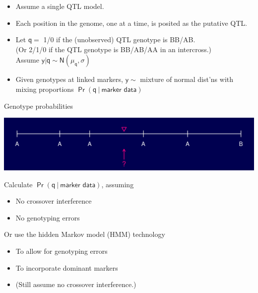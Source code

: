 \documentclass[12pt]{article}
\newcommand{\headsize}{\fontsize{35}{35} \selectfont}
\newcommand{\smallersize}{\fontsize{20}{25} \selectfont}
\begin{document}
\smallersize
\hfill \begin{minipage}{9.5in}
\begin{itemize}
\itemsep24pt
\setlength{\rightskip}{0pt plus 1fil} %
  \item Assume a {\color{mypink} single} QTL model.
  \item Each position in the genome, one at a time, is posited as the
  putative QTL.
  \item Let $\mathsf{q = }$ 1/0 if the (unobserved) QTL genotype is
  BB/AB. \\[12pt]
  {\color{myblue} (Or 2/1/0 if the QTL genotype is BB/AB/AA in an intercross.)} \\[12pt]
        Assume $\mathsf{y | q \sim N(\mu_q, \sigma)}$
  \item Given genotypes at linked markers, $\mathsf{y \sim}$ mixture of normal
  dist'ns with mixing proportions $\mathsf{\Pr(q \ | \ \text{marker data})}$
\end{itemize}
\end{minipage}



\newpage

\headsize \color{myyellow}
\hfill \begin{minipage}{5.75in}
\centering
Genotype probabilities
\end{minipage}

\vspace{15mm}

\centerline{\includegraphics{FigsA/genoprob1.pdf}}

\vspace{15mm}

\hfill
\begin{minipage}{10in}
\color{mywhite} \smallersize
Calculate {\color{myblue} $\mathsf{\Pr(q \ | \ \text{marker data})}$}, assuming
\begin{itemize}
\item No crossover interference
\item No genotyping errors
\end{itemize}

\vspace{10mm}

Or use the {\color{mypink} hidden Markov model (HMM)} technology
\begin{itemize}
\item To allow for genotyping errors
\item To incorporate dominant markers
\item {\color{myblue} (Still assume no crossover interference.)}
\end{itemize}
\end{minipage}
\end{document}
